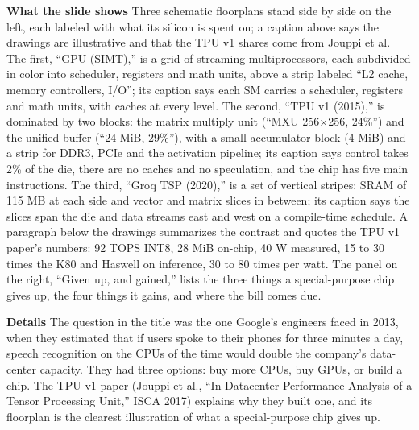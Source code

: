\documentclass[11pt,letterpaper]{article}
\newcommand{\para}[1]{\medskip\noindent\textbf{#1}\quad}
\begin{document}
\para{What the slide shows} Three schematic floorplans stand side by side on the left, each labeled with what its silicon is spent on; a caption above says the drawings are illustrative and that the TPU v1 shares come from Jouppi et al. The first, ``GPU (SIMT),'' is a grid of streaming multiprocessors, each subdivided in color into scheduler, registers and math units, above a strip labeled ``L2 cache, memory controllers, I/O''; its caption says each SM carries a scheduler, registers and math units, with caches at every level. The second, ``TPU v1 (2015),'' is dominated by two blocks: the matrix multiply unit (``MXU 256$\times$256, 24\%'') and the unified buffer (``24 MiB, 29\%''), with a small accumulator block (4 MiB) and a strip for DDR3, PCIe and the activation pipeline; its caption says control takes 2\% of the die, there are no caches and no speculation, and the chip has five main instructions. The third, ``Groq TSP (2020),'' is a set of vertical stripes: SRAM of 115 MB at each side and vector and matrix slices in between; its caption says the slices span the die and data streams east and west on a compile-time schedule. A paragraph below the drawings summarizes the contrast and quotes the TPU v1 paper's numbers: 92 TOPS INT8, 28 MiB on-chip, 40 W measured, 15 to 30 times the K80 and Haswell on inference, 30 to 80 times per watt. The panel on the right, ``Given up, and gained,'' lists the three things a special-purpose chip gives up, the four things it gains, and where the bill comes due.

\para{Details} The question in the title was the one Google's engineers faced in 2013, when they estimated that if users spoke to their phones for three minutes a day, speech recognition on the CPUs of the time would double the company's data-center capacity. They had three options: buy more CPUs, buy GPUs, or build a chip. The TPU v1 paper (Jouppi et al., ``In-Datacenter Performance Analysis of a Tensor Processing Unit,'' ISCA 2017) explains why they built one, and its floorplan is the clearest illustration of what a special-purpose chip gives up.
\end{document}
